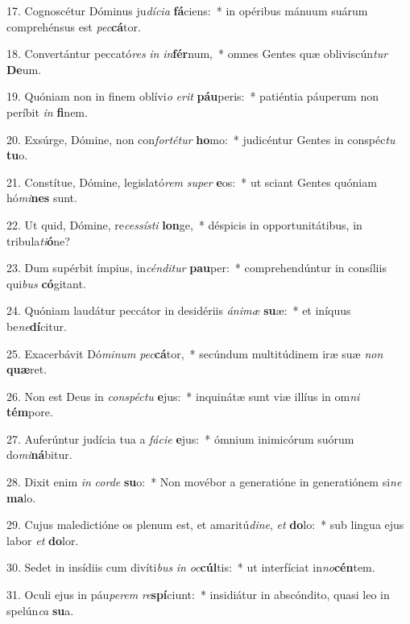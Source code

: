 17. Cognoscétur Dóminus ju\textit{dí}\textit{ci}\textit{a} \textbf{fá}ciens:~*  in opéribus mánuum suárum comprehénsus est \textit{pec}\textbf{cá}tor.\

18. Convertántur peccató\textit{res} \textit{in} \textit{in}\textbf{fér}num,~*  omnes Gentes quæ obliviscún\textit{tur} \textbf{De}um.\

19. Quóniam non in finem oblívi\textit{o} \textit{e}\textit{rit} \textbf{páu}peris:~*  patiéntia páuperum non períbit \textit{in} \textbf{fi}nem.\

20. Exsúrge, Dómine, non con\textit{for}\textit{té}\textit{tur} \textbf{ho}mo:~*  judicéntur Gentes in conspéc\textit{tu} \textbf{tu}o.\

21. Constítue, Dómine, legislató\textit{rem} \textit{su}\textit{per} \textbf{e}os:~*  ut sciant Gentes quóniam hó\textit{mi}\textbf{nes} sunt.\

22. Ut quid, Dómine, re\textit{ces}\textit{sís}\textit{ti} \textbf{lon}ge,~*  déspicis in opportunitátibus, in tribula\textit{ti}\textbf{ó}ne?\

23. Dum supérbit ímpius, in\textit{cén}\textit{di}\textit{tur} \textbf{pau}per:~*  comprehendúntur in consíliis qui\textit{bus} \textbf{có}gitant.\

24. Quóniam laudátur peccátor in desidériis \textit{á}\textit{ni}\textit{mæ} \textbf{su}æ:~*  et iníquus be\textit{ne}\textbf{dí}citur.\

25. Exacerbávit Dó\textit{mi}\textit{num} \textit{pec}\textbf{cá}tor,~*  secúndum multitúdinem iræ suæ \textit{non} \textbf{quæ}ret.\

26. Non est Deus in \textit{con}\textit{spéc}\textit{tu} \textbf{e}jus:~*  inquinátæ sunt viæ illíus in om\textit{ni} \textbf{tém}pore.\

27. Auferúntur judícia tua a \textit{fá}\textit{ci}\textit{e} \textbf{e}jus:~*  ómnium inimicórum suórum do\textit{mi}\textbf{ná}bitur.\

28. Dixit enim \textit{in} \textit{cor}\textit{de} \textbf{su}o:~*  Non movébor a generatióne in generatiónem si\textit{ne} \textbf{ma}lo.\

29. Cujus maledictióne os plenum est, et amaritú\textit{di}\textit{ne}, \textit{et} \textbf{do}lo:~*  sub lingua ejus labor \textit{et} \textbf{do}lor.\

30. Sedet in insídiis cum divíti\textit{bus} \textit{in} \textit{oc}\textbf{cúl}tis:~*  ut interfíciat in\textit{no}\textbf{cén}tem.\

31. Oculi ejus in páu\textit{pe}\textit{rem} \textit{re}\textbf{spí}ciunt:~*  insidiátur in abscóndito, quasi leo in spelún\textit{ca} \textbf{su}a.\

